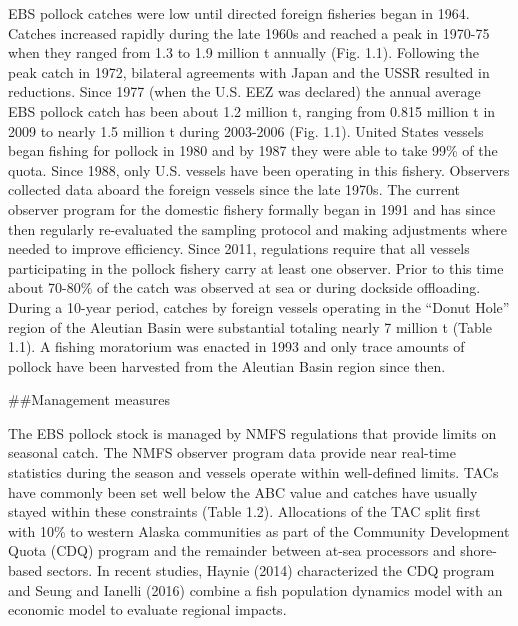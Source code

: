 EBS pollock catches were low until directed foreign fisheries began in
1964. Catches increased rapidly during the late 1960s and reached a peak
in 1970-75 when they ranged from 1.3 to 1.9 million t annually (Fig.
1.1). Following the peak catch in 1972, bilateral agreements with Japan
and the USSR resulted in reductions. Since 1977 (when the U.S. EEZ was
declared) the annual average EBS pollock catch has been about 1.2
million t, ranging from 0.815 million t in 2009 to nearly 1.5 million t
during 2003-2006 (Fig. 1.1). United States vessels began fishing for
pollock in 1980 and by 1987 they were able to take 99\% of the quota.
Since 1988, only U.S. vessels have been operating in this fishery.
Observers collected data aboard the foreign vessels since the late
1970s. The current observer program for the domestic fishery formally
began in 1991 and has since then regularly re-evaluated the sampling
protocol and making adjustments where needed to improve efficiency.
Since 2011, regulations require that all vessels participating in the
pollock fishery carry at least one observer. Prior to this time about
70-80\% of the catch was observed at sea or during dockside offloading.
During a 10-year period, catches by foreign vessels operating in the
``Donut Hole'' region of the Aleutian Basin were substantial totaling
nearly 7 million t (Table 1.1). A fishing moratorium was enacted in 1993
and only trace amounts of pollock have been harvested from the Aleutian
Basin region since then.

\#\#Management measures

The EBS pollock stock is managed by NMFS regulations that provide limits
on seasonal catch. The NMFS observer program data provide near real-time
statistics during the season and vessels operate within well-defined
limits. TACs have commonly been set well below the ABC value and catches
have usually stayed within these constraints (Table 1.2). Allocations of
the TAC split first with 10\% to western Alaska communities as part of
the Community Development Quota (CDQ) program and the remainder between
at-sea processors and shore-based sectors. In recent studies, Haynie
(2014) characterized the CDQ program and Seung and Ianelli (2016)
combine a fish population dynamics model with an economic model to
evaluate regional impacts.

